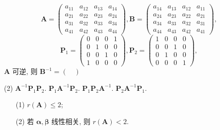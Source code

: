 \[ \bm{A} = \begin{pmatrix} a_{11} & a_{12} & a_{13} & a_{14} \\ a_{21} & a_{22} & a_{23} & a_{24} \\ a_{31} & a_{32} & a_{33} & a_{34} \\ a_{41} & a_{42} & a_{43} & a_{44} \end{pmatrix}, \bm{B} = \begin{pmatrix} a_{14} & a_{13} & a_{12} & a_{11} \\ a_{24} & a_{23} & a_{22} & a_{21} \\ a_{34} & a_{33} & a_{32} & a_{31} \\ a_{44} & a_{43} & a_{42} & a_{41} \end{pmatrix}, \]
\[ \bm{P}_1 = \begin{pmatrix} 0 & 0 & 0 & 1 \\ 0 & 1 & 0 & 0 \\ 0 & 0 & 1 & 0 \\ 1 & 0 & 0 & 0 \end{pmatrix}, \bm{P}_2 = \begin{pmatrix} 1 & 0 & 0 & 0 \\ 0 & 0 & 1 & 0 \\ 0 & 1 & 0 & 0 \\ 0 & 0 & 0 & 1 \end{pmatrix}, \]
$\displaystyle \bm{A}$ 可逆, 则 $\displaystyle \bm{B}^{-1} = ( \quad )$
\begin{tasks}(2)
  \task $\displaystyle \bm{A}^{-1}\bm{P}_1\bm{P}_2.$
  \task $\displaystyle \bm{P}_1\bm{A}^{-1}\bm{P}_2.$
  \task $\displaystyle \bm{P}_1\bm{P}_2\bm{A}^{-1}.$
  \task $\displaystyle \bm{P}_2\bm{A}^{-1}\bm{P}_1.$
\end{tasks}

\vspace{9em}

\begin{enumerate}
\item[(1)] $\displaystyle r(\bm{A}) \le 2$;
\item[(2)] 若 $\displaystyle \boldsymbol{\alpha}, \boldsymbol{\beta}$ 线性相关, 则 $\displaystyle r(\bm{A}) < 2$.
\end{enumerate}
